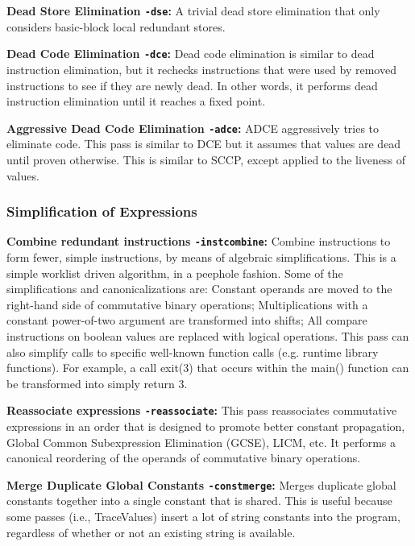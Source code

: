 \noindent\textbf{Dead Store Elimination \texttt{-dse}:}
A trivial dead store elimination that only considers basic-block local redundant stores.

\noindent\textbf{Dead Code Elimination \texttt{-dce}:}
Dead code elimination is similar to dead instruction elimination, but it rechecks instructions that were used by removed instructions to see if they are newly dead.
In other words, it performs dead instruction elimination until it reaches a fixed point.

\noindent\textbf{Aggressive Dead Code Elimination \texttt{-adce}:}
ADCE aggressively tries to eliminate code.
This pass is similar to DCE but it assumes that values are dead until proven otherwise.
This is similar to SCCP, except applied to the liveness of values.

\subsubsection{Simplification of Expressions}

\noindent\textbf{Combine redundant instructions \texttt{-instcombine}:}
Combine instructions to form fewer, simple instructions, by means of algebraic simplifications.
This is a simple worklist driven algorithm, in a peephole fashion.
Some of the simplifications and canonicalizations are:
Constant operands are moved to the right-hand side of commutative binary operations;
Multiplications with a constant power-of-two argument are transformed into shifts;
All compare instructions on boolean values are replaced with logical operations.
This pass can also simplify calls to specific well-known function calls (e.g. runtime library functions).
For example, a call exit(3) that occurs within the main() function can be transformed into simply return 3.

\noindent\textbf{Reassociate expressions \texttt{-reassociate}:}
This pass reassociates commutative expressions in an order that is designed to promote better constant propagation, Global Common Subexpression Elimination (GCSE), LICM, etc.
It performs a canonical reordering of the operands of commutative binary operations.

\noindent\textbf{Merge Duplicate Global Constants \texttt{-constmerge}:}
Merges duplicate global constants together into a single constant that is shared. This is useful because some passes (i.e., TraceValues) insert a lot of string constants into the program, regardless of whether or not an existing string is available.

